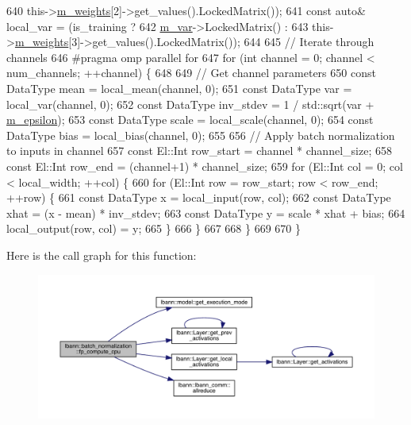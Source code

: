 \begin{DoxyCode}
640                               this->\hyperlink{classlbann_1_1Layer_a7954e30fbf9100a6ba4b56d02767a469}{m\_weights}[2]->get\_values().LockedMatrix());
641     \textcolor{keyword}{const} \textcolor{keyword}{auto}& local\_var = (is\_training ?
642                              \hyperlink{classlbann_1_1batch__normalization_aba533149e4179378ab23443b0a2a7dc6}{m\_var}->LockedMatrix() :
643                              this->\hyperlink{classlbann_1_1Layer_a7954e30fbf9100a6ba4b56d02767a469}{m\_weights}[3]->get\_values().LockedMatrix());
644  
645     \textcolor{comment}{// Iterate through channels}
646 \textcolor{preprocessor}{    #pragma omp parallel for}
647     \textcolor{keywordflow}{for} (\textcolor{keywordtype}{int} channel = 0; channel < num\_channels; ++channel) \{
648 
649       \textcolor{comment}{// Get channel parameters}
650       \textcolor{keyword}{const} DataType mean = local\_mean(channel, 0);
651       \textcolor{keyword}{const} DataType var = local\_var(channel, 0);
652       \textcolor{keyword}{const} DataType inv\_stdev = 1 / std::sqrt(var + \hyperlink{classlbann_1_1batch__normalization_ab82e74f905b7a117d9940f8542451e37}{m\_epsilon});
653       \textcolor{keyword}{const} DataType scale = local\_scale(channel, 0);
654       \textcolor{keyword}{const} DataType bias = local\_bias(channel, 0);
655 
656       \textcolor{comment}{// Apply batch normalization to inputs in channel}
657       \textcolor{keyword}{const} El::Int row\_start = channel * channel\_size;
658       \textcolor{keyword}{const} El::Int row\_end = (channel+1) * channel\_size;
659       \textcolor{keywordflow}{for} (El::Int col = 0; col < local\_width; ++col) \{
660         \textcolor{keywordflow}{for} (El::Int row = row\_start; row < row\_end; ++row) \{
661           \textcolor{keyword}{const} DataType x = local\_input(row, col);
662           \textcolor{keyword}{const} DataType xhat = (x - mean) * inv\_stdev;
663           \textcolor{keyword}{const} DataType y = scale * xhat + bias;
664           local\_output(row, col) = y;
665         \}
666       \}
667 
668     \}
669 
670   \}
\end{DoxyCode}
Here is the call graph for this function\+:\nopagebreak
\begin{figure}[H]
\begin{center}
\leavevmode
\includegraphics[width=350pt]{classlbann_1_1batch__normalization_ae4cad47f456752e4ea20add0f6f38819_cgraph}
\end{center}
\end{figure}
